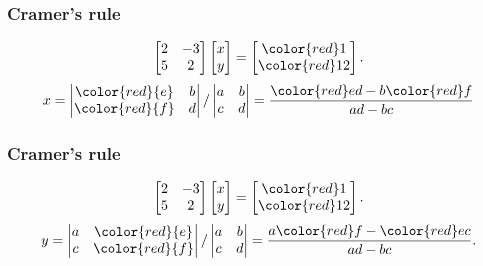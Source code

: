 \documentclass{beamer}
\begin{document}
\begin{frame}
	\frametitle{Cramer's rule}
	\Large
	\vspace{-2.95cm}
	\[ \begin{bmatrix} 2 & -3 \\ 5 & 2 \end{bmatrix}\begin{bmatrix} x \\ y \end{bmatrix}=\begin{bmatrix} {\color{red}1} \\ {\color{red}12} \end{bmatrix}.\]
\bigskip	
\[x = \begin{vmatrix} \color{red}{e} & b \\ \color{red}{f} & d \end{vmatrix}/\begin{vmatrix} a & b \\ c & d \end{vmatrix}  = { {\color{red}e}d - b{\color{red}f} \over ad - bc} \]
\end{frame}

\begin{frame}
	\frametitle{Cramer's rule}
	\Large
	\vspace{-2.95cm}
	\[ \begin{bmatrix} 2 & -3 \\ 5 & 2 \end{bmatrix}\begin{bmatrix} x \\ y \end{bmatrix}=\begin{bmatrix} {\color{red}1} \\ {\color{red}12} \end{bmatrix}.\]
\bigskip
\[y = \begin{vmatrix} a & \color{red}{e} \\ c & \color{red}{f} \end{vmatrix}/\begin{vmatrix} a & b \\ c & d \end{vmatrix}  = { a{\color{red}f} - {\color{red}e}c \over ad - bc}.\]
\end{frame}
\end{document}
